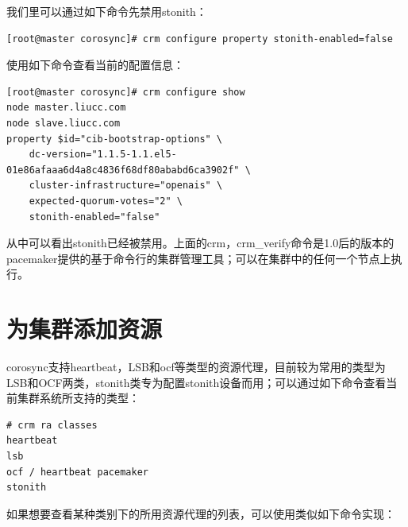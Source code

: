 我们里可以通过如下命令先禁用stonith：

\begin{verbatim}
[root@master corosync]# crm configure property stonith-enabled=false
\end{verbatim}

使用如下命令查看当前的配置信息：

\begin{verbatim}
[root@master corosync]# crm configure show
node master.liucc.com
node slave.liucc.com
property $id="cib-bootstrap-options" \
	dc-version="1.1.5-1.1.el5-01e86afaaa6d4a8c4836f68df80ababd6ca3902f" \
	cluster-infrastructure="openais" \
	expected-quorum-votes="2" \
	stonith-enabled="false"
\end{verbatim}

从中可以看出stonith已经被禁用。上面的crm，crm\_verify命令是1.0后的版本的
pacemaker提供的基于命令行的集群管理工具；可以在集群中的任何一个节点上执
行。

\section{为集群添加资源}

corosync支持heartbeat，LSB和ocf等类型的资源代理，目前较为常用的类型为
LSB和OCF两类，stonith类专为配置stonith设备而用；可以通过如下命令查看当
前集群系统所支持的类型：

\begin{verbatim}
# crm ra classes 
heartbeat
lsb
ocf / heartbeat pacemaker
stonith
\end{verbatim}

如果想要查看某种类别下的所用资源代理的列表，可以使用类似如下命令实现：

